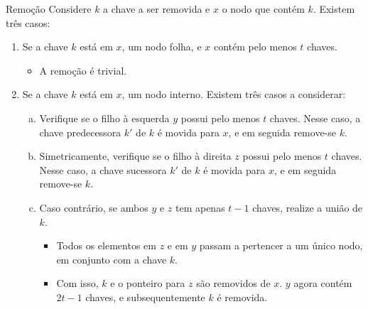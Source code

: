 \documentclass[aspectratio=169]{beamer}
\begin{document}
{%

\begin{frame}{Remoção}
Considere $k$ a chave a ser removida e $x$ o nodo que contém $k$. Existem três casos:
 \begin{enumerate}[(1)]
  \item Se a chave $k$ está em $x$, um nodo folha, e $x$ contém pelo menos $t$ chaves. 
  \begin{itemize}
  \item A remoção é trivial.
  \end{itemize}
  \item Se a chave $k$ está em $x$, um nodo interno. Existem três casos a considerar:
  \begin{enumerate}[(a)]
  \item Verifique se o filho à esquerda $y$ possui pelo menos $t$ chaves. Nesse caso, a chave predecessora $k'$ de $k$ é movida para $x$, e em seguida remove-se $k$.
  \item Simetricamente, verifique se o filho à direita $z$ possui pelo menos $t$ chaves. Nesse caso, a chave sucessora $k'$ de $k$ é movida para $x$, e em seguida remove-se $k$. 
  \item Caso contrário, se ambos $y$ e $z$  tem apenas $t-1$ chaves, realize a união de $k$.
  \begin{itemize}
  \item Todos os elementos em $z$ e em $y$ passam a pertencer a um único nodo, em conjunto com a chave $k$. 
  \item Com isso, $k$ e o ponteiro para $z$ são removidos de $x$. $y$ agora contém $2t-1$ chaves, e subsequentemente $k$ é removida.
  \end{itemize} 
  \end{enumerate} 
 \end{enumerate}
\end{frame}


}
\end{document}
